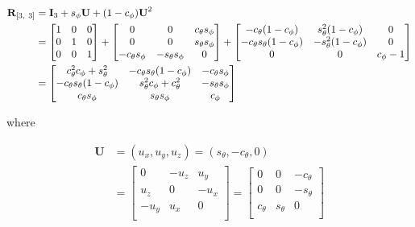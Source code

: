 \documentclass{template/monashthesis}
\begin{document}
\begin{align*}
    \textbf{R}_{[3,~3]} 
    &= \textbf{I}_3 + s_\phi\*\textbf{U} + (1-c_\phi)\*\textbf{U}^2 \\
        &=
    \begin{bmatrix}
      1 & 0 & 0 \\ 
      0 & 1 & 0 \\ 
      0 & 0 & 1 \\
    \end{bmatrix} +
    \begin{bmatrix}
      0 & 0 & c_\theta s_\phi \\
      0 & 0 & s_\theta s_\phi \\
      -c_\theta s_\phi & -s_\theta s_\phi & 0 \\
    \end{bmatrix} +
    \begin{bmatrix}
      -c_\theta (1-c_\phi) & s^2_\theta (1-c_\phi) & 0 \\
      -c_\theta s_\theta (1-c_\phi) & -s^2_\theta (1-c_\phi) & 0 \\
      0 & 0 & c_\phi-1 \\
    \end{bmatrix} \\
    &= 
    \begin{bmatrix}
      c_\theta^2 c_\phi + s_\theta^2 &
      -c_\theta s_\theta (1 - c_\phi) &
      -c_\theta s_\phi \\
      -c_\theta s_\theta (1 - c_\phi) &
      s_\theta^2 c_\phi + c_\theta^2 &
      -s_\theta s_\phi \\
      c_\theta s_\phi &
      s_\theta s_\phi &
      c_\phi
    \end{bmatrix} \\
\end{align*}

\noindent where

\begin{align*}
  \textbf{U} &= (u_x, u_y, u_z) =
  (s_\theta, -c_\theta, 0) \\ 
  &=
  \begin{bmatrix}
  0 & -u_z & u_y  \\
  u_z & 0 & -u_x \\
  -u_y & u_x & 0 \\
  \end{bmatrix} =
  \begin{bmatrix}
    0 & 0 & -c_\theta \\
    0 & 0 & -s_\theta \\
    c_\theta & s_\theta & 0 \\
  \end{bmatrix} \\
  \end{align*}
\end{document}
